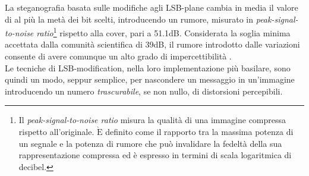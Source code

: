 La steganografia basata sulle modifiche agli LSB-plane cambia in media il valore di al più la metà dei bit scelti, introducendo un rumore, misurato in \textit{peak-signal-to-noise ratio}\footnote{Il \textit{peak-signal-to-noise ratio} misura la qualità di una immagine compressa rispetto all'originale. $\mathrm{\grave{E}}$ definito come il rapporto tra la massima potenza di un segnale e la potenza di rumore che può invalidare la fedeltà della sua rappresentazione compressa ed è espresso in termini di scala logaritmica di decibel.} rispetto alla cover, pari a 51.1dB. Considerata la soglia minima accettata dalla comunità scientifica di 39dB, il rumore introdotto dalle variazioni consente di avere comunque un alto grado di impercettibilità \cite{seeingTheUnseen, warfare}.\\Le tecniche di LSB-modification, nella loro implementazione più basilare, sono quindi un modo, seppur semplice, per nascondere un messaggio in un'immagine introducendo un numero \textit{trascurabile}, se non nullo, di distorsioni percepibili.
